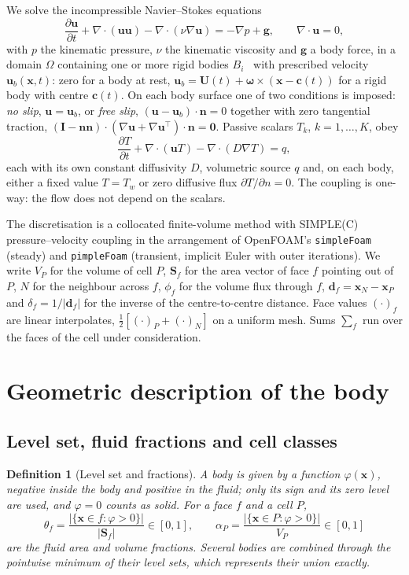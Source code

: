 \documentclass[11pt,a4paper]{article}
\newtheorem{definition}{Definition}
\theoremstyle{remark}
\newcommand{\uu}{\bm{u}}
\newcommand{\ub}{\uu_b}
\newcommand{\nn}{\bm{n}}
\newcommand{\xx}{\bm{x}}
\newcommand{\Sf}{\bm{S}_f}
\newcommand{\code}[1]{\texttt{#1}}
\begin{document}
We solve the incompressible Navier--Stokes equations
\begin{equation}
\frac{\partial \uu}{\partial t}+\nabla\!\cdot\!(\uu\uu)-\nabla\!\cdot\!(\nu\nabla\uu)
=-\nabla p+\bm{g},
\qquad \nabla\!\cdot\!\uu=0,
\label{eq:ns}
\end{equation}
with $p$ the kinematic pressure, $\nu$ the kinematic viscosity and $\bm{g}$ a body force, in
a domain $\Omega$ containing one or more rigid bodies $B_i$%
\ with prescribed velocity $\ub(\xx,t)$: zero for a body at rest,
$\ub=\bm U(t)+\bm\omega\times(\xx-\bm c(t))$ for a rigid body with centre $\bm c(t)$. On each
body surface one of two conditions is imposed: \emph{no slip}, $\uu=\ub$, or \emph{free slip},
$(\uu-\ub)\cdot\nn=0$ together with zero tangential traction,
$(\bm I-\nn\nn)\cdot(\nabla\uu+\nabla\uu^{\!\top})\cdot\nn=\bm 0$.
Passive scalars $T_k$, $k=1,\dots,K$, obey
\begin{equation}
\frac{\partial T}{\partial t}+\nabla\!\cdot\!(\uu T)-\nabla\!\cdot\!(D\nabla T)=q,
\label{eq:scalar}
\end{equation}
each with its own constant diffusivity $D$, volumetric source $q$ and, on each body, either a
fixed value $T=T_w$ or zero diffusive flux $\partial T/\partial n=0$. The coupling is one-way:
the flow does not depend on the scalars.

The discretisation is a collocated finite-volume method with SIMPLE(C) pressure--velocity
coupling in the arrangement of OpenFOAM's \code{simpleFoam} (steady) and \code{pimpleFoam}
(transient, implicit Euler with outer iterations). We write $V_P$ for the volume of cell $P$,
$\Sf$ for the area vector of face $f$ pointing out of $P$, $N$ for the neighbour across $f$,
$\phi_f$ for the volume flux through $f$, $\bm d_f=\xx_N-\xx_P$ and $\delta_f=1/|\bm d_f|$ for
the inverse of the centre-to-centre distance. Face values $(\cdot)_f$ are linear interpolates,
$\tfrac12[(\cdot)_P+(\cdot)_N]$ on a uniform mesh. Sums $\sum_f$ run over the faces of the
cell under consideration.
\section{Geometric description of the body}
\label{sec:geom}

\subsection{Level set, fluid fractions and cell classes}

\begin{definition}[Level set and fractions]
A body is given by a function $\varphi(\xx)$, negative inside the body and positive in the
fluid; only its sign and its zero level are used, and $\varphi=0$ counts as solid. For a face
$f$ and a cell $P$,
\begin{equation}
\theta_f=\frac{|\{\xx\in f:\varphi>0\}|}{|\Sf|}\in[0,1],\qquad
\alpha_P=\frac{|\{\xx\in P:\varphi>0\}|}{V_P}\in[0,1]
\label{eq:fractions}
\end{equation}
are the fluid area and volume fractions. Several bodies are combined through the pointwise
minimum of their level sets, which represents their union exactly.
\end{definition}
\end{document}
